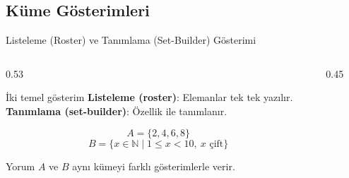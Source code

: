 \documentclass[light]{lutbeamer}
\begin{document}
\subsection{Küme Gösterimleri}
\begin{frame}{Listeleme (Roster) ve Tanımlama (Set-Builder) Gösterimi}
    \begin{columns}[T]
        \begin{column}{0.53\textwidth}
            \begin{block}{İki temel gösterim}
                \textbf{Listeleme (roster)}: Elemanlar tek tek yazılır. \\
                \textbf{Tanımlama (set-builder)}: Özellik ile tanımlanır.
            \end{block}

            \[
                A=\{2,4,6,8\}
                \]
                \[
                B=\{x \in \mathbb{N} \mid 1\le x<10,\ x \text{ çift}\}
            \]

            \begin{exampleblock}{Yorum}
                $A$ ve $B$ aynı kümeyi farklı gösterimlerle verir.
            \end{exampleblock}
        \end{column}
        \begin{column}{0.45\textwidth}
            \centering
        \end{column}
    \end{columns}
\end{frame}
\end{document}
